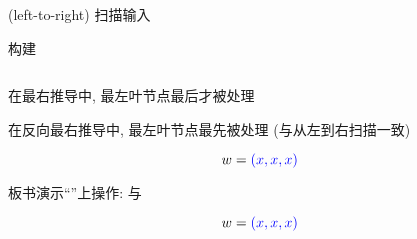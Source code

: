 \begin{frame}{}
  \begin{center}
    {\large {}}

    \vspace{0.80cm}
    \begin{columns}
        \begin{description}
          \setlength{\itemsep}{15pt}
          \item[$L:$]  (left-to-right) 扫描输入
          \item[$R:$] 构建
        \end{description}
    \end{columns}

    \vspace{0.80cm}
    在最右推导中, 最左叶节点最后才被处理

    \vspace{0.50cm}
    在反向最右推导中, 最左叶节点最先被处理 (与从左到右扫描一致)
  \end{center}
\end{frame}

\begin{frame}{}
  \begin{center}
    
    \[
      w = \textcolor{blue}{(x, x, x)}
    \]
  \end{center}
\end{frame}

\begin{frame}{}
  \begin{center}
    板书演示``''上操作: 与

    \vspace{-0.30cm}
    \[
      w = \textcolor{blue}{(x, x, x)}
    \]
  \end{center}
\end{frame}

